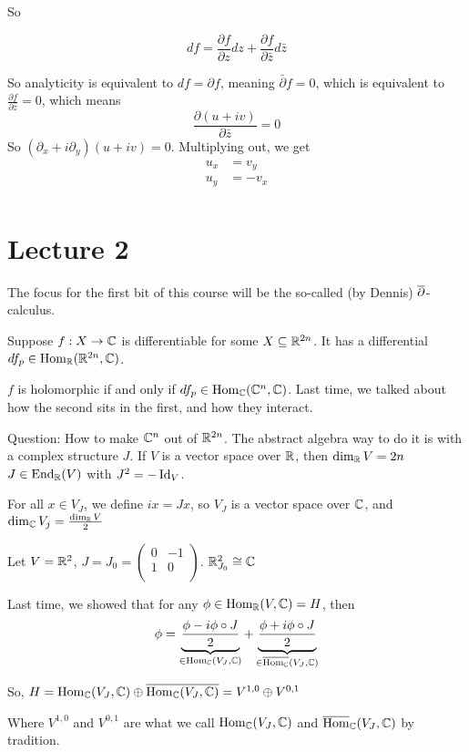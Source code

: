 \documentclass[x11names,reqno,14pt]{extarticle}
\begin{document}
So 

\[
df = \frac{\partial f}{\partial z}dz + \frac{\partial f}{\partial \bar{z}}d\bar{z}
\]

So analyticity is equivalent to $df = \partial f$, meaning $\bar{\partial}f = 0$, which is equivalent to $\frac{\partial f}{\partial \bar{z}} = 0$, which means
\[
\frac{\partial (u + iv)}{\partial\bar{z}} = 0
\]
So $(\partial_x + i\partial_y)(u + iv) = 0$. Multiplying out, we get
\begin{align*}
u_x & = v_y \\
u_y & = - v_x \\
\end{align*}

\section*{Lecture 2} 

The focus for the first bit of this course will be the so-called (by Dennis) $\overline{\partial}$-calculus. 

Suppose $f:X\to\mathbb{C}$ is differentiable for some $X \subseteq \mathbb{R}^{2n}$. It has a differential $df_p \in {\mathrm{Hom}}_{\mathbb{R}}(\mathbb{R}^{2n},\mathbb{C})$.

$f$ is holomorphic if and only if $df_p\in{\mathrm{Hom}}_{\mathbb{C}}(\mathbb{C}^n, \mathbb{C})$. Last time, we talked about how the second sits in the first, and how they interact. 

Question: How to make $\mathbb{C}^n$ out of $\mathbb{R}^{2n}$. The abstract algebra way to do it is with a complex structure $J$. If $V$ is a vector space over $\mathbb{R}$, then $\dim_{\mathbb{R}} V = 2n$
$J\in{\mathrm{End}}_{\mathbb{R}}(V)$ with $J^2 = -\operatorname{\mathrm{Id}}_V$. 

For all $x \in V_J$, we define $ix = Jx$, so $V_J$ is a vector space over $\mathbb{C}$, and $\dim_{\mathbb{C}} V_j = \frac{\dim_{\mathbb{R}} V}{2}$

\exm Let $V = \mathbb{R}^2$, $J = J_0 = \begin{pmatrix} 0 & -1 \\ 1 & 0 \\ \end{pmatrix}$. $\mathbb{R}^2_{J_0}\cong \mathbb{C}$

Last time, we showed that for any $\phi\in{\mathrm{Hom}}_{\mathbb{R}}(V,\mathbb{C}) = H$, then 
\[
\phi = \underbrace{\frac{\phi - i\phi\circ J}{2}}_{\in {\mathrm{Hom}}_{\mathbb{C}}(V_J,\mathbb{C})} + \underbrace{\frac{\phi + i\phi\circ J}{2}}_{\in\overline{{\mathrm{Hom}}_{\mathbb{C}}}(V_J,\mathbb{C})}
\]

So, $H = {\mathrm{Hom}}_{\mathbb{C}}(V_J,\mathbb{C})\oplus\overline{{\mathrm{Hom}}_{\mathbb{C}}(V_J,\mathbb{C})} = V^{1, 0}\oplus V^{0, 1}$

Where $V^{1, 0}$ and $V^{0, 1}$ are what we call ${\mathrm{Hom}}_{\mathbb{C}}(V_J,\mathbb{C})$ and $\overline{{\mathrm{Hom}}}_{\mathbb{C}}(V_J,\mathbb{C})$ by tradition. 
\end{document}
